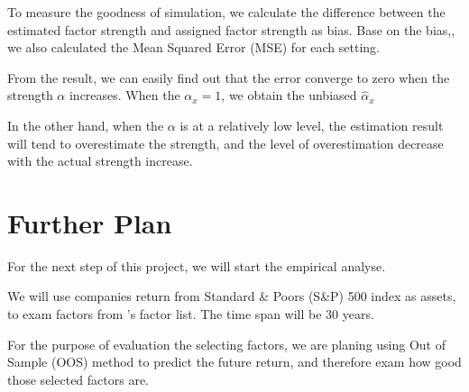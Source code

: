 \documentclass[12pt]{article}
\begin{document}
To measure the goodness of simulation, we calculate the difference between the estimated factor strength and assigned factor strength as bias.
Base on the bias,, we also calculated the Mean Squared Error (MSE) for each setting.

From the result, we can easily find out that the error converge to zero when the strength $\alpha$ increases. 
When the $\alpha _x= 1$, we obtain the unbiased $\hat{\alpha}_{x}$

In the other hand, when the $\alpha$ is at a relatively low level, the estimation result will tend to overestimate the strength, and the level of overestimation decrease with the actual strength increase.

			\section{Further Plan}
For the next step of this project, we will start the empirical analyse. 

We will use companies return from Standard \& Poors (S\&P) 500 index as assets, to exam factors from 's factor list. 
The time span will be 30 years. 

For the purpose of evaluation the selecting factors, we are planing using Out of Sample (OOS) method to predict the future return, and therefore exam how good those selected factors are. 


\newpage



\newpage
\appendix


\end{document}
